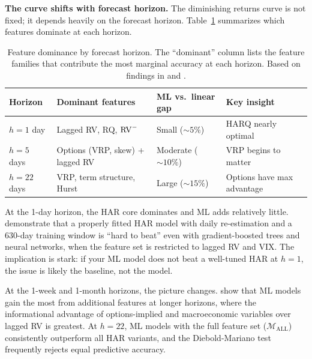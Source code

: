 \textbf{The curve shifts with forecast horizon.}
The diminishing returns curve is not fixed; it depends heavily on the forecast horizon.
Table~\ref{tab:horizon-dominant} summarizes which features dominate at each horizon.

\begin{table}[ht]
\centering
\caption{Feature dominance by forecast horizon. The ``dominant'' column lists the feature families that contribute the most marginal accuracy at each horizon. Based on findings in \citet{ChristensenSiggaardVeliyev2023} and \citet{HARdToBeat2024}.}
\label{tab:horizon-dominant}
\small
\begin{tabular}{@{}llll@{}}
\toprule
\textbf{Horizon} & \textbf{Dominant features} & \textbf{ML vs.\ linear gap} & \textbf{Key insight} \\
\midrule
$h = 1$ day & Lagged RV, RQ, $\operatorname{RV}^-$ & Small (${\sim}5\%$) & HARQ nearly optimal \\
$h = 5$ days & Options (VRP, skew) + lagged RV & Moderate (${\sim}10\%$) & VRP begins to matter \\
$h = 22$ days & VRP, term structure, Hurst & Large (${\sim}15\%$) & Options have max advantage \\
\bottomrule
\end{tabular}
\end{table}

At the 1-day horizon, the HAR core dominates and ML adds relatively little.
\citet{HARdToBeat2024} demonstrate that a properly fitted HAR model with daily re-estimation and a 630-day training window is ``hard to beat'' even with gradient-boosted trees and neural networks, when the feature set is restricted to lagged RV and VIX.
The implication is stark: if your ML model does not beat a well-tuned HAR at $h=1$, the issue is likely the baseline, not the model.

At the 1-week and 1-month horizons, the picture changes.
\citet{ChristensenSiggaardVeliyev2023} show that ML models gain the most from additional features at longer horizons, where the informational advantage of options-implied and macroeconomic variables over lagged RV is greatest.
At $h = 22$, ML models with the full feature set ($\mathcal{M}_{\text{ALL}}$) consistently outperform all HAR variants, and the Diebold-Mariano test frequently rejects equal predictive accuracy.

